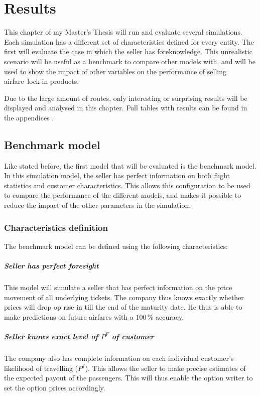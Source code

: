 \chapter{Results}
This chapter of my Master's Thesis will run and evaluate several simulations. Each simulation has a different set of characteristics defined for every entity. The first will evaluate the case in which the seller has foreknowledge. This unrealistic scenario will be useful as a benchmark to compare other models with, and will be used to show the impact of other variables on the performance of selling airfare~lock-in products.

Due to the large amount of routes, only interesting or surprising results will be displayed and analysed in this chapter. Full tables with results can be found in the appendices .


\section{Benchmark model}
Like stated before, the first model that will be evaluated is the benchmark model. In this simulation model, the seller has perfect information on both flight statistics and customer characteristics. This allows this configuration to be used to compare the performance of the different models, and makes it possible to reduce the impact of the other parameters in the simulation.

\subsection{Characteristics definition}
The benchmark model can be defined using the following characteristics:

\paragraph{Seller has perfect foresight}
This model will simulate a seller that has perfect information on the price movement of all underlying tickets. The company thus knows exactly whether prices will drop op rise in till the end of the maturity date. He thus is able to make predictions on future airfares with a $100\,\%$ accuracy.

\paragraph{Seller knows exact level of $P^F$ of customer}
The company also has complete information on each individual customer's likelihood of travelling ($P^f$). This allows the seller to make precise estimates of the expected payout of the passengers. This will thus enable the option writer to set the option prices accordingly.

